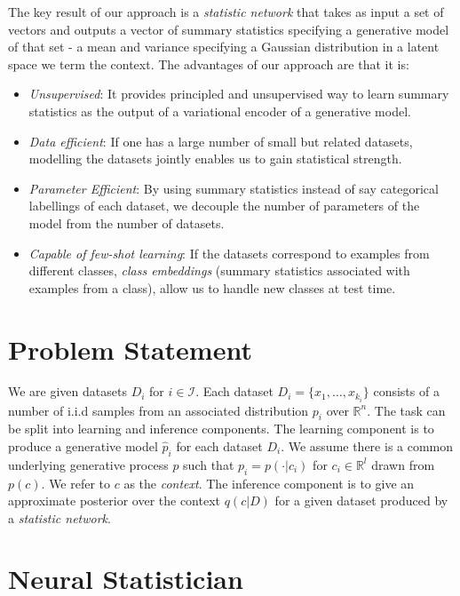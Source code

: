 \documentclass{article} %
\newcommand{\iid}{i.i.d }
\begin{document}
The key result of our approach is a \emph{statistic network} that takes as input a set of vectors and outputs a vector of summary statistics specifying a generative model of that set - a mean and variance specifying a Gaussian distribution in a latent space we term the context. The advantages of our approach are that it is:
\begin{itemize}
\item \emph{Unsupervised}: It provides principled and unsupervised way to learn summary statistics as the output of a variational encoder of a generative model.
\item \emph{Data efficient}: If one has a large number of small but related datasets, modelling the datasets jointly enables us to gain statistical strength.
\item \emph{Parameter Efficient}: By using summary statistics instead of say categorical labellings of each dataset, we decouple the number of parameters of the model from the number of datasets.
\item \emph{Capable of few-shot learning}: If the datasets correspond to examples from different classes, \emph{class embeddings} (summary statistics associated with examples from a class), allow us to handle new classes at test time.
\end{itemize}


\section{Problem Statement}
\vspace{-0.5em}
We are given datasets $D_i$ for $i \in \mathcal{I}$. Each dataset $D_i = \{x_1, \dots, x_{k_i} \}$ consists of a number of \iid samples from an associated distribution $p_i$ over $\mathbb{R}^n$. The task can be split into learning and inference components. The learning component is to produce a generative model $\hat{p}_i$ for each dataset $D_i$. We assume there is a common underlying generative process $p$ such that $p_i = p(\cdot | c_i)$ for $c_i \in \mathbb{R}^l$ drawn from $p(c)$. We refer to $c$ as the \emph{context}. The inference component is to give an approximate posterior over the context $q(c| D)$ for a given dataset produced by a \emph{statistic network}.

\vspace{-0.5em}
\section{Neural Statistician}
\end{document}
